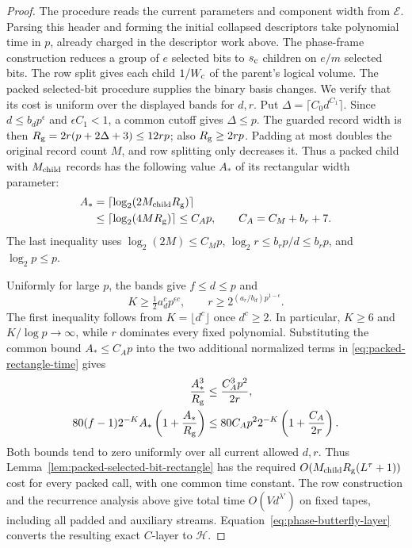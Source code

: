 \documentclass[11pt]{article}
\theoremstyle{definition}
\begin{document}
\begin{proof}
The procedure reads the current parameters and component width from
$\mathcal E$. Parsing this header and forming the initial collapsed
descriptors take polynomial time in $p$, already charged in the
descriptor work above.
The phase-frame construction reduces a group of $e$ selected bits to
$s_{\rm c}$ children on $e/m$ selected bits.  The row split gives
each child $1/W_{\rm c}$ of the parent's logical volume. The packed
selected-bit procedure supplies the binary basis changes. We verify
that its cost is uniform over the displayed bands for $d,r$.
Put $\Delta=\lceil C_0d^{C_1}\rceil$. Since $d\le b_dp^\epsilon$
and $\epsilon C_1<1$, a common cutoff gives $\Delta\le p$. The guarded
record width is then
$R_{\rm g}=2r(p+2\Delta+3)\le12rp$; also $R_{\rm g}\ge2rp$.
Padding at most doubles the original record count $M$, and row splitting
only decreases it. Thus a packed child with $M_{\rm child}$ records has
the following value $A_*$ of its rectangular width parameter:
\[
\begin{split}
 A_*
 &=\lceil\log_2(2M_{\rm child}R_{\rm g})\rceil\\
 &\le\lceil\log_2(4MR_{\rm g})\rceil\le C_Ap,
 \qquad C_A=C_M+b_r+7.
\end{split}
\]
The last inequality uses $\log_2(2M)\le C_Mp$,
$\log_2r\le b_rp/d\le b_rp$, and $\log_2p\le p$.

Uniformly for large $p$, the bands give $f\le d\le p$ and
\[
 K\ge\tfrac12a_d^c p^{\epsilon c},\qquad
 r\ge2^{(a_r/b_d)p^{1-\epsilon}}.
\]
The first inequality follows from $K=\lfloor d^c\rfloor$ once
$d^c\ge2$. In particular, $K\ge6$ and $K/\log p\to\infty$, while
$r$ dominates every fixed polynomial. Substituting the common bound
$A_*\le C_Ap$ into the two additional normalized
terms in \eqref{eq:packed-rectangle-time} gives
\[
\begin{aligned}
 \frac{A_*^3}{R_{\rm g}}
 &\le\frac{C_A^3p^2}{2r},\\
 80(f-1)2^{-K}A_*\left(1+\frac{A_*}{R_{\rm g}}\right)
 &\le80C_Ap^2 2^{-K}\left(1+\frac{C_A}{2r}\right).
\end{aligned}
\]
Both bounds tend to zero uniformly over all current allowed $d,r$.
Thus Lemma~\ref{lem:packed-selected-bit-rectangle} has the required
$O(M_{\rm child}R_{\rm g}(L^\tau+1))$ cost for every packed call,
with one common time constant.
The row construction and the recurrence analysis
above give total time $O(Vd^{\lambda'})$ on fixed tapes, including
all padded and auxiliary streams. Equation~\eqref{eq:phase-butterfly-layer}
converts the resulting exact $C$-layer to $\mathcal H$.


\end{proof}
\end{document}
